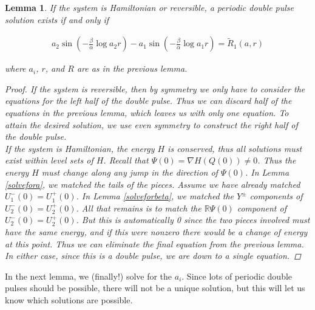 \documentclass[12pt]{article}
\def\R{{\mathbb R}}
\newtheorem{lemma}{Lemma}
\begin{document}
\begin{lemma}\label{reducedsystemtosolve}
If the system is Hamiltonian or reversible, a periodic double pulse solution exists if and only if

\begin{align*}
a_2 \sin \left(-\frac{\beta}{\alpha} \log a_2 r \right) - a_1 \sin \left( - \frac{\beta}{\alpha} \log a_1 r \right) = \tilde{R}_1(a, r)
\end{align*}

where $a_i$, $r$, and $R$ are as in the previous lemma.

\begin{proof} 
If the system is reversible, then by symmetry we only have to consider the equations for the left half of the double pulse. Thus we can discard half of the equations in the previous lemma, which leaves us with only one equation. To attain the desired solution, we use even symmetry to construct the right half of the double pulse.\\

If the system is Hamiltonian, the energy $H$ is conserved, thus all solutions must exist within level sets of $H$. Recall that $\Psi(0) = \nabla H(Q(0)) \neq 0$. Thus the energy $H$ must change along any jump in the direction of $\Psi(0)$. In Lemma \ref{solvefora}, we matched the tails of the pieces. Assume we have already matched $U_1^-(0) = U_1^+(0)$. In Lemma \ref{solveforbeta}, we matched the $Y^\pm$ components of $U_2^-(0) = U_2^+(0)$. All that remains is to match the $\R \Psi(0)$ component of $U_2^-(0) = U_2^+(0)$. But this is automatically 0 since the two pieces involved must have the same energy, and if this were nonzero there would be a change of energy at this point. Thus we can eliminate the final equation from the previous lemma.\\

In either case, since this is a double pulse, we are down to a single equation.
\end{proof}
\end{lemma}

In the next lemma, we (finally!) solve for the $a_i$. Since lots of periodic double pulses should be possible, there will not be a unique solution, but this will let us know which solutions are possible.

\end{document}
